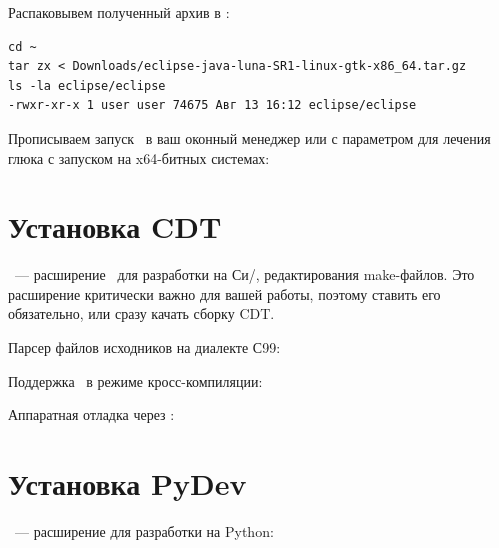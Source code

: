 Распаковывем полученный архив
в :

\begin{verbatim}
cd ~
tar zx < Downloads/eclipse-java-luna-SR1-linux-gtk-x86_64.tar.gz 
ls -la eclipse/eclipse
-rwxr-xr-x 1 user user 74675 Авг 13 16:12 eclipse/eclipse
\end{verbatim}

Прописываем запуск \eclipse\ в ваш оконный менеджер или 
с параметром  для лечения глюка с запуском на x64-битных
системах:


\section{Установка CDT}

\href{https://eclipse.org/cdt/}{}\ --- расширение \eclipse\ для
разработки на Си/\cpp, редактирования make-файлов. Это расширение критически
важно для вашей работы, поэтому ставить его обязательно, или сразу качать сборку
CDT\eclipse.
\bigskip









Парсер файлов исходников на диалекте С99:

Поддержка \ в режиме кросс-компиляции:

Аппаратная отладка через :


\section{Установка PyDev}

\href{http://pydev.org/}{}\ --- расширение для разработки на Python:
\bigskip


